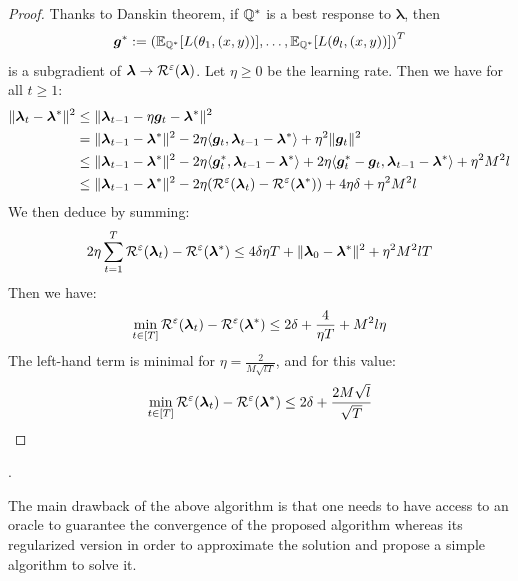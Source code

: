 \begin{proof}
Thanks to Danskin theorem, if $\mathbb{Q}^*$ is a best response to $\bm{\lambda}$, then $$\bm{g}^*:=\left(\mathbb{E}_{\QQ^*}\left[\loss(\theta_1,(x,y))\right],\dots,\mathbb{E}_{\QQ^*}\left[\loss(\theta_l,(x,y))\right]\right)^T$$ is a subgradient of $\bm{\lambda}\to \mathcal{R}^\varepsilon(\bm{\lambda})$. Let $\eta\geq 0$ be the learning rate. Then we have for all $t\geq 1$:
\begin{align*}
\lVert \bm{\lambda}_t-\bm{\lambda}^*\rVert^2&\leq \lVert \bm{\lambda}_{t-1}-\eta \bm{g}_t-\bm{\lambda}^*\rVert^2\\
&=\lVert \bm{\lambda}_{t-1}-\bm{\lambda}^*\rVert^2-2\eta \langle\bm{g}_t, \bm{\lambda}_{t-1}-\bm{\lambda}^*\rangle+ \eta^2\lVert \bm{g}_t\rVert^2\\
&\leq \lVert \bm{\lambda}_{t-1}-\bm{\lambda}^*\rVert^2-2\eta \langle\bm{g}^*_t, \bm{\lambda}_{t-1}-\bm{\lambda}^*\rangle+2\eta\langle\bm{g}^*_t-\bm{g}_t, \bm{\lambda}_{t-1}-\bm{\lambda}^*\rangle+\eta^2 M^2 l\\
&\leq \lVert \bm{\lambda}_{t-1}-\bm{\lambda}^*\rVert^2-2\eta\left(\risk^\varepsilon(\bm{\lambda}_t)-\risk^\varepsilon(\bm{\lambda}^*)\right) +4\eta\delta+\eta^2  M^2 l%
\end{align*}
We then deduce by summing:
\begin{align*}
   2\eta \sum_{t=1}^T \mathcal{R}^\varepsilon(\bm{\lambda}_t)-\mathcal{R}^\varepsilon(\bm{\lambda}^*) \leq 4\delta\eta T +\lVert \bm{\lambda}_{0}-\bm{\lambda}^*\rVert^2+\eta^2 M^2 lT
\end{align*}
Then we have:
\begin{align*}
    \min_{t\in[T]}\mathcal{R}^\varepsilon(\bm{\lambda}_t)-\mathcal{R}^\varepsilon(\bm{\lambda}^*)\leq 2\delta+\frac{4}{\eta T}+M^2l\eta
\end{align*}
The left-hand term is minimal for $\eta=\frac{2}{M\sqrt{lT}}$, and for this value:
\begin{align*}
    \min_{t\in[T]}\mathcal{R}^\varepsilon(\bm{\lambda}_t)-\mathcal{R}^\varepsilon(\bm{\lambda}^*)\leq 2\delta+\frac{2M\sqrt{l}}{\sqrt{T}}
\end{align*}
\end{proof}. 

The main drawback of the above algorithm is that one needs to have access to an oracle to guarantee the convergence of the proposed algorithm whereas its regularized version in order to approximate the solution and propose a simple algorithm to solve it.


